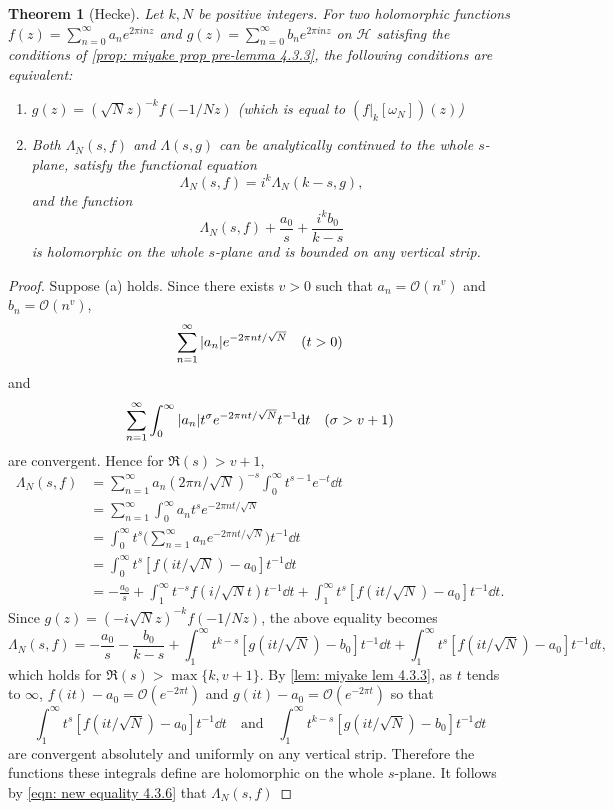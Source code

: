 \documentclass[10pt,leqno,twoside]{article}
\theoremstyle{plain}
\newtheorem{theorem}[lem]{Theorem}
\theoremstyle{definition}
\numberwithin{equation}{section}
\numberwithin{lem}{section}
\begin{document}
\begin{theorem}[Hecke]\label{thm: miyake thm 4.3.6}
    Let $k,N$ be positive integers. For two holomorphic functions $f(z) = \sum_{n=0}^\infty a_ne^{2\pi i nz}$ and $g(z) = \sum_{n=0}^\infty b_ne^{2\pi i nz}$ on $\mathcal H$ satisfing the conditions of \cref{prop: miyake prop pre-lemma 4.3.3}, the following conditions are equivalent: 
    \begin{enumerate}[label = \textup{(\alph*)}]
        \item $g(z) = (\sqrt{N}z)^{-k}f(-1/Nz)$ \textup{(which is equal to $(f|_k[\omega_N])(z)$)}
        \item Both $\varLambda_N(s,f)$ and $\varLambda(s,g)$ can be analytically continued to the whole $s$-plane, satisfy the functional equation \[\varLambda_N(s,f) = i^k\varLambda_N(k-s,g),\] and the function \[\varLambda_N(s,f) + \frac{a_0}{s} + \frac{i^kb_0}{k-s}\] is holomorphic on the whole $s$-plane and is bounded on any vertical strip.
    \end{enumerate}
\end{theorem}
\begin{proof}
    Suppose (a) holds. Since there exists $v>0$ such that $a_n = \mathcal O(n^v)$ and $b_n = \mathcal O(n^v)$, 
    \[\sum_{n=1}^\infty \abs{a_n}e^{-2\pi n t/\sqrt{N}}\quad (t>0)\] and 
    \[\sum_{n=1}^\infty \int_0^\infty \abs{a_n}t^\sigma e^{-2\pi n t/\sqrt{N}}t^{-1}\dd t \quad (\sigma > v+1)\] are convergent. Hence for $\Re(s)>v+1$, 
    \begin{align*}
        \varLambda_N(s,f) &= \sum_{n=1}^\infty a_n(2\pi n/\sqrt{N})^{-s}\int_0^\infty t^{s-1}e^{-t}\dd t\\
        &= \sum_{n=1}^\infty \int_0^\infty a_nt^s e^{-2\pi n t/\sqrt{N}}\\
        &= \int_0^\infty t^s\bigg(\sum_{n=1}^\infty a_n e^{-2\pi nt /\sqrt{N}}\bigg)t^{-1}\dd t\\
        &= \int_0^\infty t^s[f(it/\sqrt{N}) - a_0]t^{-1}\dd t\\
        &= -\frac{a_0}{s} + \int_1^\infty t^{-s}f(i/\sqrt{N}t)t^{-1}\dd t + \int_1^\infty t^s[f(it/\sqrt{N}) - a_0]t^{-1}\dd t.
    \end{align*}
    Since $g(z) = (-i\sqrt{N}z)^{-k}f(-1/Nz)$, the above equality becomes 
    \begin{equation}\label{eqn: new equality 4.3.6}
        \varLambda_N(s,f) = -\frac{a_0}{s} - \frac{b_0}{k-s} + \int_1^\infty t^{k-s}[g(it/\sqrt{N})-b_0]t^{-1}\dd t + \int_1^\infty t^s[f(it/\sqrt{N}) - a_0]t^{-1}\dd t,
    \end{equation} which holds for $\Re(s)>\max\{k,v+1\}$. By \cref{lem: miyake lem 4.3.3}, as $t$ tends to $\infty$, $f(it)-a_0 = \mathcal O(e^{-2\pi t})$ and $g(it)-a_0 = \mathcal O(e^{-2\pi t})$ so that 
    \[\int_1^\infty t^s[f(it/\sqrt{N}) - a_0]t^{-1}\dd t\quad\text{and}\quad \int_1^\infty t^{k-s}[g(it/\sqrt{N})-b_0]t^{-1}\dd t\] are convergent absolutely and uniformly on any vertical strip. Therefore the functions these integrals define are holomorphic on the whole $s$-plane. It follows by \cref{eqn: new equality 4.3.6} that $\varLambda_N(s,f)$
\end{proof}
\end{document}
